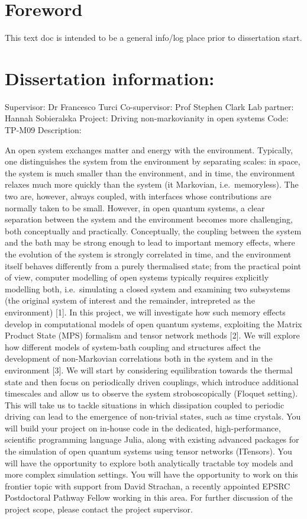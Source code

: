\documentclass[
  letterpaper,
  DIV=11,
  numbers=noendperiod]{scrartcl}
\author{}
\date{}
\begin{document}
\section{Foreword}\label{foreword}

This text doc is intended to be a general info/log place prior to
dissertation start.

\section{Dissertation information:}\label{dissertation-information}

Supervisor: Dr Francesco Turci Co-supervisor: Prof Stephen Clark Lab
partner: Hannah Sobieralska Project: Driving non-markovianity in open
systems Code: TP-M09 Description:

An open system exchanges matter and energy with the environment.
Typically, one distinguishes the system from the environment by
separating scales: in space, the system is much smaller than the
environment, and in time, the environment relaxes much more quickly than
the system (it Markovian, i.e.~memoryless). The two are, however, always
coupled, with interfaces whose contributions are normally taken to be
small. However, in open quantum systems, a clear separation between the
system and the environment becomes more challenging, both conceptually
and practically. Conceptually, the coupling between the system and the
bath may be strong enough to lead to important memory effects, where the
evolution of the system is strongly correlated in time, and the
environment itself behaves differently from a purely thermalised state;
from the practical point of view, computer modelling of open systems
typically requires explicitly modelling both, i.e.~simulating a closed
system and examining two subsystems (the original system of interest and
the remainder, intrepreted as the environment) {[}1{]}. In this project,
we will investigate how such memory effects develop in computational
models of open quantum systems, exploiting the Matrix Product State
(MPS) formalism and tensor network methods {[}2{]}. We will explore how
different models of system-bath coupling and structures affect the
development of non-Markovian correlations both in the system and in the
environment {[}3{]}. We will start by considering equilibration towards
the thermal state and then focus on periodically driven couplings, which
introduce additional timescales and allow us to observe the system
stroboscopically (Floquet setting). This will take us to tackle
situations in which dissipation coupled to periodic driving can lead to
the emergence of non-trivial states, such as time crystals. You will
build your project on in-house code in the dedicated, high-performance,
scientific programming language Julia, along with existing advanced
packages for the simulation of open quantum systems using tensor
networks (ITensors). You will have the opportunity to explore both
analytically tractable toy models and more complex simulation settings.
You will have the opportunity to work on this frontier topic with
support from David Strachan, a recently appointed EPSRC Postdoctoral
Pathway Fellow working in this area. For further discussion of the
project scope, please contact the project supervisor.
\end{document}
